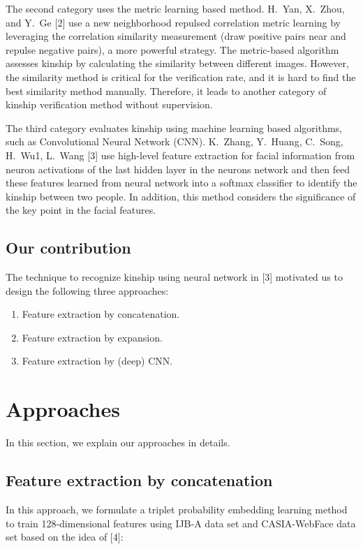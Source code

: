 \documentclass{article}
\begin{document}
The second category uses the metric learning based method. H.\ Yan, X.\ Zhou, and Y.\ Ge [2] use a new neighborhood repulsed correlation metric learning by leveraging the correlation similarity measurement (draw positive pairs near and repulse negative pairs), a more powerful strategy. The metric-based algorithm assesses kinship by calculating the similarity between different images. However, the similarity method is critical for the verification rate, and it is hard to find the best similarity method manually. Therefore, it leads to another category of kinship verification method without supervision.

The third category evaluates kinship using machine learning based algorithms, such as Convolutional Neural Network (CNN). K.\ Zhang, Y.\ Huang, C.\ Song, H.\ Wu1, L.\ Wang [3] use high-level feature extraction for facial information from neuron activations of the last hidden layer in the neurons network and then feed these features learned from neural network into a softmax classifier to identify the kinship between two people. In addition, this method considers the significance of the key point in the facial features.

\subsection{Our contribution}
The technique to recognize kinship using neural network in [3] motivated us to design the following three approaches:
\begin{enumerate}[(1)]
%
\item Feature extraction by concatenation.
%
\item Feature extraction by expansion.
%
\item Feature extraction by (deep) CNN.
%
\end{enumerate}

\section{Approaches}
In this section, we explain our approaches in details.
\subsection{Feature extraction by concatenation}  %
In this approach, we formulate a triplet probability embedding learning method to train 128-dimensional features using IJB-A data set and CASIA-WebFace data set based on the idea of [4]:
\end{document}
